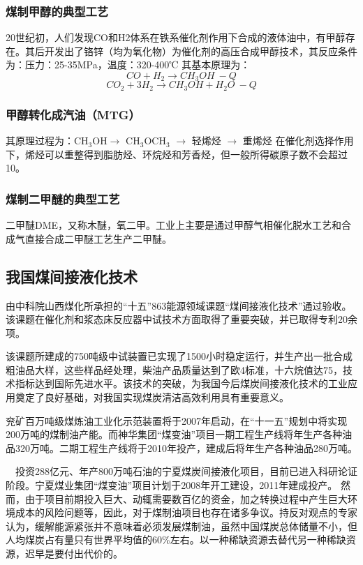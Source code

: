 \documentclass[10pt,openany]{ctexbook}
\begin{document}
\subsubsection{煤制甲醇的典型工艺}
20世纪初，人们发现CO和H2体系在铁系催化剂作用下合成的液体油中，有甲醇存在。其后开发出了铬锌（均为氧化物）为催化剂的高压合成甲醇技术，其反应条件为：压力：25-35MPa，温度：320-400℃
其基本原理为：
$$CO+H_2 \longrightarrow CH_3OH~-Q $$
$$CO_2+3H_2 \longrightarrow CH_3OH+H_2O~-Q $$
\subsubsection{甲醇转化成汽油（MTG）}
其原理过程为：CH$_3$OH$\longrightarrow$ CH$_3$OCH$_3$ $\longrightarrow$ 轻烯烃 $\longrightarrow$ 重烯烃
在催化剂选择作用下，烯烃可以重整得到脂肪烃、环烷烃和芳香烃，但一般所得碳原子数不会超过10。
\subsubsection{煤制二甲醚的典型工艺}
二甲醚DME，又称木醚，氧二甲。工业上主要是通过甲醇气相催化脱水工艺和合成气直接合成二甲醚工艺生产二甲醚。
\subsection{我国煤间接液化技术}
由中科院山西煤化所承担的“十五”863能源领域课题“煤间接液化技术”通过验收。该课题在催化剂和浆态床反应器中试技术方面取得了重要突破，并已取得专利20余项。 \par
该课题所建成的750吨级中试装置已实现了1500小时稳定运行，并生产出一批合成粗油品大样，这些样品经处理，柴油产品质量达到了欧4标准，十六烷值达75，技术指标达到国际先进水平。该技术的突破，为我国今后煤炭间接液化技术的工业应用奠定了良好基础，对我国实现煤炭清洁高效利用具有重要意义。\par
兖矿百万吨级煤炼油工业化示范装置将于2007年启动，在“十一五”规划中将实现200万吨的煤制油产能。而神华集团“煤变油”项目一期工程生产线将年生产各种油品320万吨。二期工程生产线将于2010年投产，建成后将年生产各种油品280万吨。\par
　投资288亿元、年产800万吨石油的宁夏煤炭间接液化项目，目前已进入科研论证阶段。宁夏煤业集团“煤变油”项目计划于2008年开工建设，2011年建成投产。
然而，由于项目前期投入巨大、动辄需要数百亿的资金，加之转换过程中产生巨大环境成本的风险问题等，因此，对于煤制油项目也存在诸多争议。持反对观点的专家认为，缓解能源紧张并不意味着必须发展煤制油，虽然中国煤炭总体储量不小，但人均煤炭占有量只有世界平均值的60\%左右。以一种稀缺资源去替代另一种稀缺资源，迟早是要付出代价的。

\end{document}
